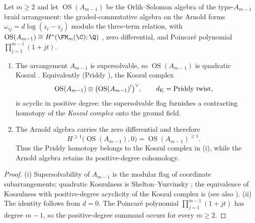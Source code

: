 \begin{lemma}
\label{lem:chiral-homotopy-transport}
Let $m \geq 2$ and let $\operatorname{OS}(A_{m-1})$ be the
Orlik--Solomon algebra of the type-$A_{m-1}$ braid arrangement:
the graded-commutative algebra on the Arnold forms
$\omega_{ij} = d\log(z_i - z_j)$ modulo the three-term relation,
with $\operatorname{OS}(A_{m-1}) \cong H^{*}(\FM_m(\C);\Q)$
\cite{Arnold1969,OrlikSolomon1980}, zero differential, and
Poincar\'e polynomial $\prod_{j=1}^{m-1}(1+jt)$.
\begin{enumerate}[label=\textup{(\roman*)}]
\item The arrangement $A_{m-1}$ is supersolvable, so
$\operatorname{OS}(A_{m-1})$ is quadratic Koszul
\cite{SheltonYuzvinsky1997}. Equivalently
\textup{(}Priddy \cite{Priddy1970}\textup{)}, the Koszul complex
\[
 \operatorname{OS}(A_{m-1}) \otimes
 \bigl(\operatorname{OS}(A_{m-1})^{!}\bigr)^{\vee},
 \qquad d_{\mathrm K} = \textup{Priddy twist},
\]
is acyclic in positive degree: the supersolvable flag furnishes a
contracting homotopy of the \emph{Koszul complex} onto the ground
field.
\item The Arnold algebra carries the zero differential and therefore
 \[
 H^{\geq1}\bigl(\operatorname{OS}(A_{m-1}),0\bigr)
 =\operatorname{OS}(A_{m-1})^{\geq1}.
 \]
 Thus the Priddy homotopy belongs to the Koszul complex in
 \textup{(i)}, while the Arnold algebra retains its positive-degree
 cohomology.
\end{enumerate}
\end{lemma}

\begin{proof}
(i) Supersolvability of $A_{m-1}$ is the modular flag of
coordinate subarrangements; quadratic Koszulness is
Shelton--Yuzvinsky \cite{SheltonYuzvinsky1997}; the equivalence of
Koszulness with positive-degree acyclicity of the Koszul complex
is \cite{Priddy1970} (see also \cite[Ch.~3]{LV12}).
(ii) The identity follows from \(d=0\).  The Poincar\'e polynomial
\(\prod_{j=1}^{m-1}(1+jt)\) has degree \(m-1\), so the
positive-degree summand occurs for every \(m\geq2\).
\end{proof}

